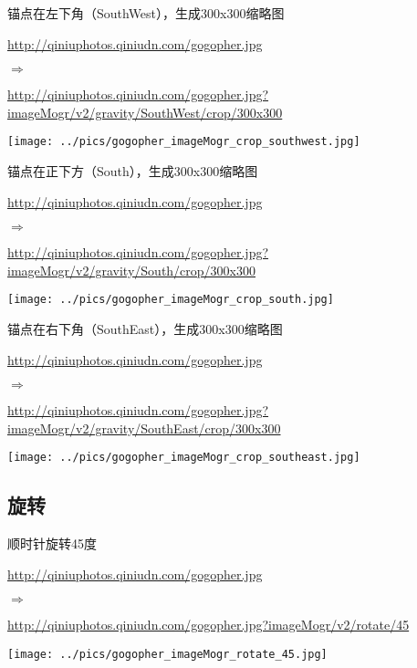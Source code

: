 \documentclass[11pt, oneside]{book}
\newcommand{\qpar}[1]{
\vspace{0.25em}
\noindent
#1\par
\vspace{0.25em}
}
\newcommand{\qurl}[1]{\footnotesize\url{#1}\normalsize}
\begin{document}
\begin{CJK*}{UTF8}{song}
\begin{sample}
  \caption{锚点在左下角（SouthWest），生成300x300缩略图}
    \qpar{\qurl{http://qiniuphotos.qiniudn.com/gogopher.jpg}}
    \qpar{$\Rightarrow$}
    \qpar{\qurl{http://qiniuphotos.qiniudn.com/gogopher.jpg?imageMogr/v2/gravity/SouthWest/crop/300x300}}

    \begin{center}
      \texttt{[image: ../pics/gogopher\_imageMogr\_crop\_southwest.jpg]}
    \end{center}
  \label{imageMogr-crop-southwest}
\end{sample}

\begin{sample}
  \caption{锚点在正下方（South），生成300x300缩略图}
    \qpar{\qurl{http://qiniuphotos.qiniudn.com/gogopher.jpg}}
    \qpar{$\Rightarrow$}
    \qpar{\qurl{http://qiniuphotos.qiniudn.com/gogopher.jpg?imageMogr/v2/gravity/South/crop/300x300}}

    \begin{center}
      \texttt{[image: ../pics/gogopher\_imageMogr\_crop\_south.jpg]}
    \end{center}
  \label{imageMogr-crop-south}
\end{sample}

\begin{sample}
  \caption{锚点在右下角（SouthEast），生成300x300缩略图}
    \qpar{\qurl{http://qiniuphotos.qiniudn.com/gogopher.jpg}}
    \qpar{$\Rightarrow$}
    \qpar{\qurl{http://qiniuphotos.qiniudn.com/gogopher.jpg?imageMogr/v2/gravity/SouthEast/crop/300x300}}

    \begin{center}
      \texttt{[image: ../pics/gogopher\_imageMogr\_crop\_southeast.jpg]}
    \end{center}
  \label{imageMogr-crop-southeast}
\end{sample}

\clearpage

\subsection{旋转}

\begin{sample}
  \caption{顺时针旋转45度}
    \qpar{\qurl{http://qiniuphotos.qiniudn.com/gogopher.jpg}}
    \qpar{$\Rightarrow$}
    \qpar{\qurl{http://qiniuphotos.qiniudn.com/gogopher.jpg?imageMogr/v2/rotate/45}}

    \begin{center}
      \texttt{[image: ../pics/gogopher\_imageMogr\_rotate\_45.jpg]}
    \end{center}
  \label{imageMogr-rotate-45}
\end{sample}


\end{CJK*}
\end{document}
